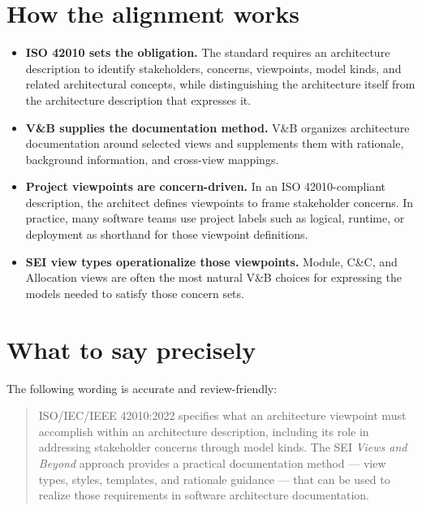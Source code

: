\documentclass[11pt]{article}
\begin{document}
\section*{How the alignment works}
\begin{itemize}
  \item \textbf{ISO 42010 sets the obligation.} The standard requires an architecture description to identify stakeholders, concerns, viewpoints, model kinds, and related architectural concepts, while distinguishing the architecture itself from the architecture description that expresses it.\cite{iso42010,conceptualmodel}
  \item \textbf{V\&B supplies the documentation method.} V\&B organizes architecture documentation around selected views and supplements them with rationale, background information, and cross-view mappings.\cite{vandb}
  \item \textbf{Project viewpoints are concern-driven.} In an ISO 42010-compliant description, the architect defines viewpoints to frame stakeholder concerns. In practice, many software teams use project labels such as logical, runtime, or deployment as shorthand for those viewpoint definitions.\cite{iso42010,conceptualmodel}
  \item \textbf{SEI view types operationalize those viewpoints.} Module, C\&C, and Allocation views are often the most natural V\&B choices for expressing the models needed to satisfy those concern sets.\cite{vandb}
\end{itemize}

\section*{What to say precisely}
The following wording is accurate and review-friendly:

\begin{quote}
ISO/IEC/IEEE 42010:2022 specifies what an architecture viewpoint must accomplish within an architecture description, including its role in addressing stakeholder concerns through model kinds. The SEI \emph{Views and Beyond} approach provides a practical documentation method --- view types, styles, templates, and rationale guidance --- that can be used to realize those requirements in software architecture documentation.\cite{iso42010,conceptualmodel,vandb}
\end{quote}
\end{document}
